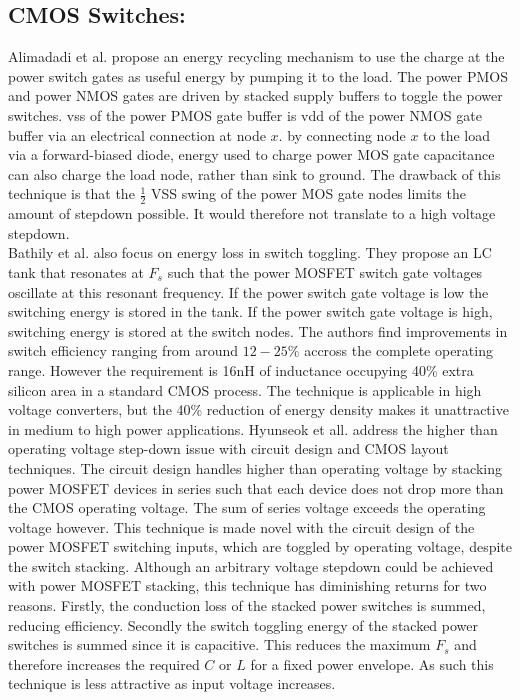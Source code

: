 \documentclass[letterpaper,twocolumn,10pt]{article}
\begin{document}
\subsection{CMOS Switches: }Alimadadi et al.\cite{Alimadadi2008} propose an energy recycling mechanism to use the charge at the power switch gates as useful energy by pumping it to the load. The power PMOS and power NMOS gates are driven by stacked supply buffers to toggle the power switches. vss of the power PMOS gate buffer is vdd of the power NMOS gate buffer via an electrical connection at node $x$. by connecting node $x$ to the load via a forward-biased diode, energy used to charge power MOS gate capacitance can also charge the load node, rather than sink to ground. The drawback of this technique is that the $\frac{1}{2}$ VSS swing of the power MOS gate nodes limits the amount of stepdown possible. It would therefore not translate to a high voltage stepdown.\\
\indent Bathily et al.\cite{Bathily2012} also focus on energy loss in switch toggling. They propose an LC tank that resonates at $F_s$ such that the power MOSFET switch gate voltages oscillate at this resonant frequency. If the power switch gate voltage is low the switching energy is stored in the tank. If the power switch gate voltage is high, switching energy is stored at the switch nodes. The authors find improvements in switch efficiency ranging from around $12 - 25\%$ accross the complete operating range. However the requirement is 16nH of inductance occupying 40\% extra silicon area in a standard CMOS process. The technique is applicable in high voltage converters, but the 40\% reduction of energy density makes it unattractive in medium to high power applications.
\indent Hyunseok et all.\cite{Hyunseok2012} address the higher than operating voltage step-down issue with circuit design and CMOS layout techniques. The circuit design handles higher than operating voltage by stacking power MOSFET devices in series such that each device does not drop more than the CMOS operating voltage. The sum of series voltage exceeds the operating voltage however. This technique is made novel with the circuit design of the power MOSFET switching inputs, which are toggled by operating voltage, despite the switch stacking. Although an arbitrary voltage stepdown could be achieved with power MOSFET stacking, this technique has diminishing returns for two reasons. Firstly, the conduction loss of the stacked power switches is summed, reducing efficiency. Secondly the switch toggling energy of the stacked power switches is summed since it is capacitive. This reduces the maximum $F_s$ and therefore increases the required $C$ or $L$ for a fixed power envelope. As such this technique is less attractive as input voltage increases.\\
\end{document}
